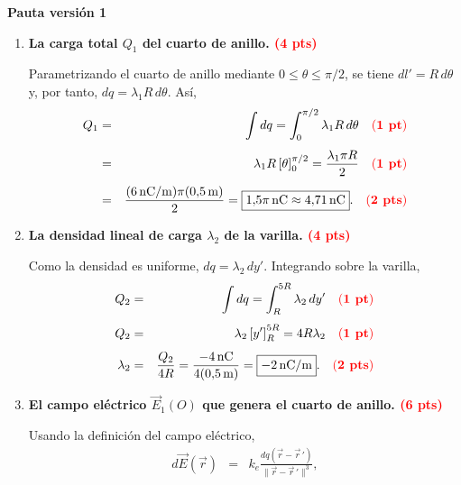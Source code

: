 \documentclass{article}
\newcommand{\ke}{k_e}
\begin{document}
\newpage
\begin{center}
\textbf{Pauta versión 1}
\end{center}

\begin{enumerate}[label={\alph*)}]

\item \textbf{La carga total $Q_1$ del cuarto de anillo.
      \textcolor{red}{(\textbf{4 pts})}}

Parametrizando el cuarto de anillo mediante $0\leq\theta\leq\pi/2$, se tiene
$dl'=R\,d\theta$ y, por tanto, $dq=\lambda_1R\,d\theta$. Así,
\begin{eqnarray*}
  Q_1 &=& \int dq=\int_0^{\pi/2}\lambda_1R\,d\theta
  \quad{\color{red}(\textbf{1 pt})}
  \\[4pt]
  &=& \lambda_1R\left[\theta\right]_0^{\pi/2}
  =\frac{\lambda_1\pi R}{2}
  \quad{\color{red}(\textbf{1 pt})}\\[4pt]
  &=& \frac{(6\,\text{nC/m})\pi(0{,}5\,\text{m})}{2}
  =\boxed{1{,}5\pi\,\text{nC}\approx4{,}71\,\text{nC}}.
  \quad{\color{red}(\textbf{2 pts})}
\end{eqnarray*}

\item \textbf{La densidad lineal de carga $\lambda_2$ de la varilla.
      \textcolor{red}{(\textbf{4 pts})}}

Como la densidad es uniforme, $dq=\lambda_2\,dy'$. Integrando sobre la varilla,
\begin{eqnarray*}
  Q_2 &=& \int dq=\int_R^{5R}\lambda_2\,dy'
  \quad{\color{red}(\textbf{1 pt})}\\[4pt]
  Q_2 &=& \lambda_2\left[y'\right]_R^{5R}=4R\lambda_2
  \quad{\color{red}(\textbf{1 pt})}\\[4pt]
  \lambda_2 &=& \frac{Q_2}{4R}
  =\frac{-4\,\text{nC}}{4(0{,}5\,\text{m})}
  =\boxed{-2\,\text{nC/m}}.
  \quad{\color{red}(\textbf{2 pts})}
\end{eqnarray*}

\item \textbf{El campo eléctrico $\vec E_1(O)$ que genera el cuarto de anillo.
      \textcolor{red}{(\textbf{6 pts})}}

Usando la definición del campo eléctrico,
\begin{eqnarray*}
  d\vec{E}(\vec{r}) &=& \ke\frac{dq\left(\vec{r}-\vec{r}\,'\right)}{\|\vec{r}-\vec{r}\,'\|^3},
\end{eqnarray*}


\end{enumerate}
\end{document}
